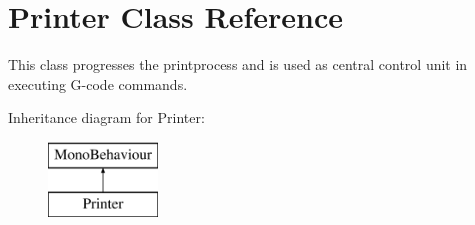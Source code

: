 \hypertarget{class_printer}{}\section{Printer Class Reference}
\label{class_printer}


This class progresses the printprocess and is used as central control unit in executing G-\/code commands.  


Inheritance diagram for Printer\+:\begin{figure}[H]
\begin{center}
\leavevmode
\includegraphics[height=2.000000cm]{class_printer}
\end{center}
\end{figure}
